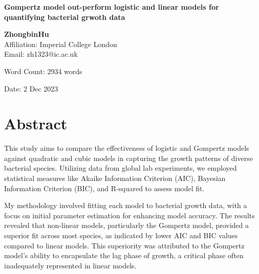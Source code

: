 \documentclass[11pt]{article}
\begin{document}
\begin{titlepage}
    \begin{center}
        \vspace*{1cm}
        
        \Large
        \textbf{Gompertz model out-perform logistic and linear models for quantifying bacterial grwoth data}
        
        \vspace{1.5cm}
        
        \textbf{ZhongbinHu}\\
        Affiliation: Imperial College London\\
        Email: zh1323@ic.ac.uk
        
        \vfill
        
        Word Count: 2934 words
        
        \vspace{0.8cm}
        
        \Large
        Date: 2 Dec 2023
        
    \end{center}
\end{titlepage}


\onehalfspacing
\section{Abstract}
This study aims to compare the effectiveness of logistic and Gompertz models against quadratic and cubic models in capturing the growth patterns of diverse bacterial species.  Utilizing data from global lab experiments, we employed statistical measures like Akaike Information Criterion (AIC), Bayesian Information Criterion (BIC), and R-squared to assess model fit.

My methodology involved fitting each model to bacterial growth data, with a focus on initial parameter estimation for enhancing model accuracy.  The results revealed that non-linear models, particularly the Gompertz model, provided a superior fit across most species, as indicated by lower AIC and BIC values compared to linear models.  This superiority was attributed to the Gompertz model's ability to encapsulate the lag phase of growth, a critical phase often inadequately represented in linear models.
\end{document}
